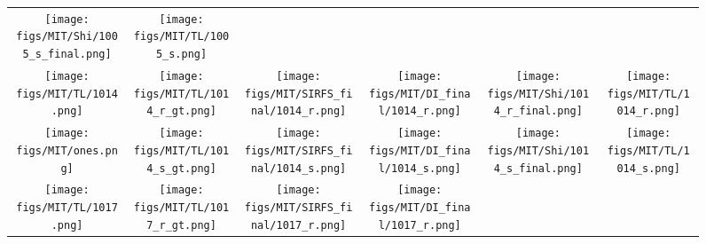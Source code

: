 \documentclass[10pt,twocolumn,letterpaper]{article}
\begin{document}
\begin{figure}[t]
\begin{tabular}{@{\hspace{-0.1em}}c@{\hspace{-0.1em}}c@{\hspace{-0.1em}}c@{\hspace{-0.1em}}c@{\hspace{-0.1em}}c@{\hspace{-0.1em}}c@{\hspace{-0.1em}}}
        \texttt{[image: figs/MIT/Shi/1005\_s\_final.png]}  \vspace{-0.05em} &
        \texttt{[image: figs/MIT/TL/1005\_s.png]}  \vspace{-0.05em} \\   
        \texttt{[image: figs/MIT/TL/1014.png]} \vspace{-0.05em} & 
        \texttt{[image: figs/MIT/TL/1014\_r\_gt.png]}  \vspace{-0.05em} &
        \texttt{[image: figs/MIT/SIRFS\_final/1014\_r.png]}  \vspace{-0.05em} &
        \texttt{[image: figs/MIT/DI\_final/1014\_r.png]}  \vspace{-0.05em} &
        \texttt{[image: figs/MIT/Shi/1014\_r\_final.png]}  \vspace{-0.05em} &        
        \texttt{[image: figs/MIT/TL/1014\_r.png]}  \vspace{-0.05em} \\  
       \texttt{[image: figs/MIT/ones.png]} \vspace{-0.05em} & 
        \texttt{[image: figs/MIT/TL/1014\_s\_gt.png]}  \vspace{-0.05em} &
        \texttt{[image: figs/MIT/SIRFS\_final/1014\_s.png]}  \vspace{-0.05em} &
        \texttt{[image: figs/MIT/DI\_final/1014\_s.png]}  \vspace{-0.05em} &
        \texttt{[image: figs/MIT/Shi/1014\_s\_final.png]}  \vspace{-0.05em} &
        \texttt{[image: figs/MIT/TL/1014\_s.png]}  \vspace{-0.05em} \\
        \texttt{[image: figs/MIT/TL/1017.png]} \vspace{-0.05em} & 
        \texttt{[image: figs/MIT/TL/1017\_r\_gt.png]}  \vspace{-0.05em} &
        \texttt{[image: figs/MIT/SIRFS\_final/1017\_r.png]}  \vspace{-0.05em} &
        \texttt{[image: figs/MIT/DI\_final/1017\_r.png]}  \vspace{-0.05em} &

\end{tabular}
\end{figure}
\end{document}
